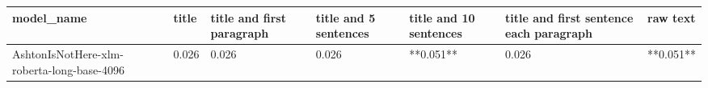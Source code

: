 \begin{tabular}{lllllll}
\toprule
                                model\_name & title & title and first paragraph & title and 5 sentences & title and 10 sentences & title and first sentence each paragraph &  raw text \\
\midrule
AshtonIsNotHere-xlm-roberta-long-base-4096 & 0.026 &                     0.026 &                 0.026 &              **0.051** &                                   0.026 & **0.051** \\
\bottomrule
\end{tabular}
